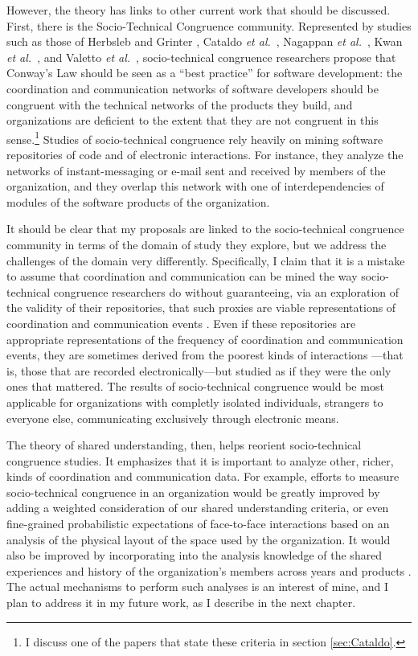 However, the theory has links to other current work that should be discussed. First, there is the Socio-Technical Congruence community. Represented by studies such as those of Herbsleb and Grinter , Cataldo \emph{et al.}\ , Nagappan \emph{et al.}\ , Kwan \emph{et al.}\ , and Valetto \emph{et al.}\ , socio-technical congruence researchers propose that Conway's Law should be seen as a ``best practice'' for software development: the coordination and communication networks of software developers should be congruent with the technical networks of the products they build, and organizations are deficient to the extent that they are not congruent in this sense.\footnote{I discuss one of the papers that state these criteria in section \ref{sec:Cataldo}.} Studies of socio-technical congruence rely heavily on mining software repositories of code and of electronic interactions. For instance, they analyze the networks of instant-messaging or e-mail sent and received by members of the organization, and they overlap this network with one of interdependencies of modules of the software products of the organization.

It should be clear that my proposals are linked to the socio-technical congruence community in terms of the domain of study they explore, but we address the challenges of the domain very differently. Specifically, I claim that it is a mistake to assume that coordination and communication can be mined the way socio-technical congruence researchers do without guaranteeing, via an exploration of the validity of their repositories, that such proxies are viable representations of coordination and communication events \cite{Aranda2009}. Even if these repositories are appropriate representations of the frequency of coordination and communication events, they are sometimes derived from the poorest kinds of interactions \cite{Olson2000}---that is, those that are recorded electronically---but studied as if they were the only ones that mattered. The results of socio-technical congruence would be most applicable for organizations with completly isolated individuals, strangers to everyone else, communicating exclusively through electronic means.

The theory of shared understanding, then, helps reorient socio-technical congruence studies. It emphasizes that it is important to analyze other, richer, kinds of coordination and communication data. For example, efforts to measure socio-technical congruence in an organization would be greatly improved by adding a weighted consideration of our shared understanding criteria, or even fine-grained probabilistic expectations of face-to-face interactions based on an analysis of the physical layout of the space used by the organization. It would also be improved by incorporating into the analysis knowledge of the shared experiences and history of the organization's members across years and products \cite{Aranda2007}. The actual mechanisms to perform such analyses is an interest of mine, and I plan to address it in my future work, as I describe in the next chapter.

